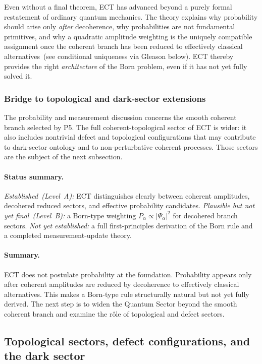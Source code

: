Even without a final theorem, ECT has advanced beyond a purely formal
restatement of ordinary quantum mechanics.
The theory explains why probability should arise only \emph{after}
decoherence, why probabilities are not fundamental primitives, and why
a quadratic amplitude weighting is the uniquely compatible assignment
once the coherent branch has been reduced to effectively classical
alternatives~(see conditional uniqueness via Gleason below).
ECT thereby provides the right \emph{architecture} of the Born
problem, even if it has not yet fully solved it.

\subsubsection*{Bridge to topological and dark-sector extensions}

The probability and measurement discussion concerns the smooth
coherent branch selected by P5.
The full coherent-topological sector of ECT is wider: it also includes
nontrivial defect and topological configurations that may contribute
to dark-sector ontology and to non-perturbative coherent processes.
Those sectors are the subject of the next subsection.

\paragraph{Status summary.}
\textit{Established~(Level~A):}
ECT distinguishes clearly between coherent amplitudes, decohered
reduced sectors, and effective probability candidates.
\textit{Plausible but not yet final~(Level~B):}
a Born-type weighting $P_\alpha\propto|\Psi_\alpha|^2$ for decohered
branch sectors.
\textit{Not yet established:}
a full first-principles derivation of the Born rule and a completed
measurement-update theory.

\paragraph{Summary.}
ECT does not postulate probability at the foundation.
Probability appears only after coherent amplitudes are reduced by
decoherence to effectively classical alternatives.
This makes a Born-type rule structurally natural but not yet fully
derived.
The next step is to widen the Quantum Sector beyond the smooth
coherent branch and examine the r\^ole of topological and defect
sectors.

\subsection{Topological sectors, defect configurations, and the dark sector}
\label{sec:qs_defects}


